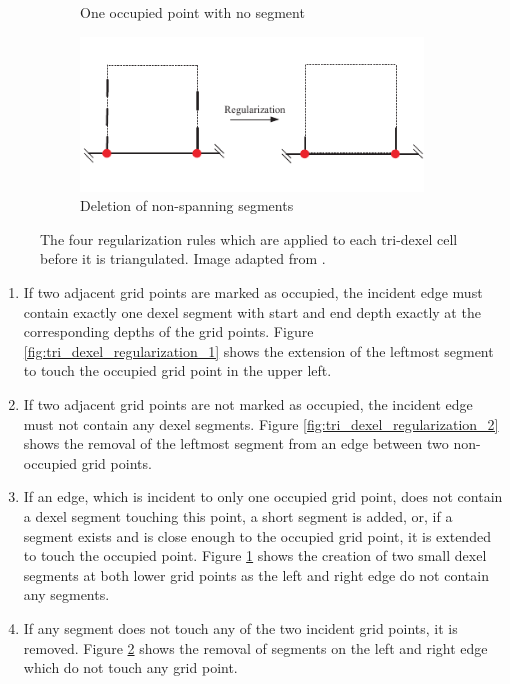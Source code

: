 \begin{figure}[h]
\begin{subfigure}[t]{0.45\textwidth}
		\caption{One occupied point with no segment}
		\label{fig:tri_dexel_regularization_3}
	\end{subfigure}
	\begin{subfigure}[t]{0.45\textwidth}
		\centering
		\includegraphics[width=\textwidth]{images/tri_dexel_regularization_4}
		\caption{Deletion of non-spanning segments}
		\label{fig:tri_dexel_regularization_4}
	\end{subfigure}
	\caption{
		The four regularization rules which are applied to each tri-dexel cell before it is triangulated.
		Image adapted from \cite{tridexel_reconstruction}.
	}
	\label{fig:tri_dexel_regularization}
\end{figure}

\begin{enumerate}
	\item If two adjacent grid points are marked as occupied, the incident edge must contain exactly one dexel segment with start and end depth exactly at the corresponding depths of the grid points.
	Figure \ref{fig:tri_dexel_regularization_1} shows the extension of the leftmost segment to touch the occupied grid point in the upper left.

	\item If two adjacent grid points are not marked as occupied, the incident edge must not contain any dexel segments.
	Figure \ref{fig:tri_dexel_regularization_2} shows the removal of the leftmost segment from an edge between two non-occupied grid points.

	\item If an edge, which is incident to only one occupied grid point, does not contain a dexel segment touching this point, a short segment is added, or, if a segment exists and is close enough to the occupied grid point, it is extended to touch the occupied point.
	Figure \ref{fig:tri_dexel_regularization_3} shows the creation of two small dexel segments at both lower grid points as the left and right edge do not contain any segments.

	\item If any segment does not touch any of the two incident grid points, it is removed.
	Figure \ref{fig:tri_dexel_regularization_4} shows the removal of segments on the left and right edge which do not touch any grid point.
\end{enumerate}

